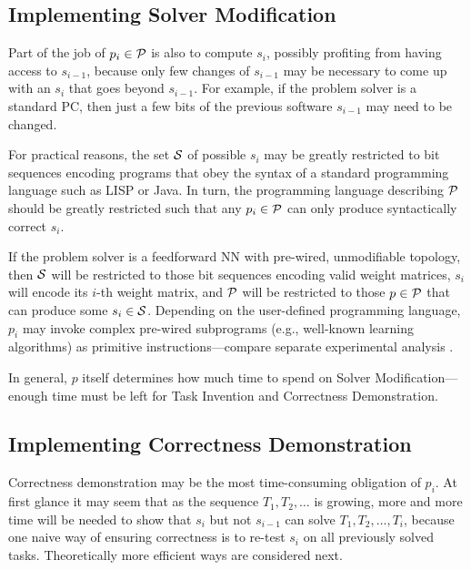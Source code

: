 \documentclass{article}
\begin{document}
\subsection{Implementing {\sc Solver Modification}}
\label{policychange}

Part of the job of $p_i \in \cal P$ is also to compute $s_i$, possibly profiting from having access to $s_{i-1}$, because only few changes of  $s_{i-1}$ may be necessary to come up with an $s_i$ that goes beyond $s_{i-1}$. For example, if  the problem solver is a standard PC,  then just a few bits of the previous software $s_{i-1}$ may need to be changed.

For practical reasons, the set  $\cal S$ of  possible $s_i$ may be greatly restricted to bit sequences 
encoding programs that obey the syntax of a standard programming language such as LISP or Java. In turn, the programming language describing  $\cal P$ should be greatly restricted such that any $p_i \in \cal P$ can only produce syntactically correct $s_i$. 


If the problem solver is a feedforward NN with pre-wired, unmodifiable topology, then 
$\cal S$ will be restricted to those bit sequences encoding valid weight matrices, 
$s_i$ will encode its $i$-th weight matrix, and $\cal P$ will be restricted to those $p \in \cal P$ 
that can produce  some $s_i \in \cal S$. Depending on the user-defined programming language,
$p_i$ may invoke complex pre-wired subprograms (e.g., well-known
learning algorithms) as primitive instructions---compare separate experimental analysis \cite{rupesh2012icdl,powerplay2012experiments}.

In general, $p$ itself determines how much time to spend on {\sc Solver Modification}---enough time must be left
for {\sc Task Invention} and {\sc Correctness Demonstration}.

\subsection{Implementing {\sc Correctness Demonstration}}
\label{correctness}

Correctness demonstration may be the most  time-consuming obligation of $p_i$.
At first glance it may seem that as the sequence $T_1, T_2, \ldots $ is growing,
more and more time will be needed to show that $s_i$ but not $s_{i-1}$ can solve $T_1, T_2, \ldots, T_i$,
because one naive way of ensuring correctness is to re-test $s_i$ on all previously solved tasks.
Theoretically more efficient ways are considered next.
\end{document}
